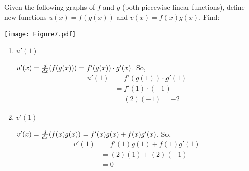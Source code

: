 \documentclass[nooutcomes]{ximera}
\begin{document}
\begin{problem}
  Given the following graphs of $f$ and $g$ (both piecewise
  linear functions), define new functions $u(x) = f(g(x))$ and
  $v(x) = f(x)g(x)$.  Find:

  \begin{image}
    \texttt{[image: Figure7.pdf]}
  \end{image}

  \begin{enumerate}
	
  \item $u'(1)$
    \begin{freeResponse}
      $u'(x) = \frac{d}{dx}(f(g(x))) = f'(g(x)) \cdot g'(x)$.  So,
      \begin{align*}
        u'(1) &= f'(g(1)) \cdot g'(1) \\
              &= f'(1) \cdot (-1) \\
              &= (2)(-1) = -2 
      \end{align*}  
    \end{freeResponse}
		
		
		
	
  \item $v'(1)$
    \begin{freeResponse}
      $v'(x) = \frac{d}{dx}(f(x)g(x)) = f'(x)g(x) + f(x)g'(x)$.  So,
      \begin{align*}
        v'(1) &= f'(1) g(1) + f(1) g'(1) \\
              &= (2)(1) + (2)(-1) \\
              &= 0
      \end{align*}
    \end{freeResponse}
  \end{enumerate}		
			
		
\end{problem}
	
	
	
		
			
\end{document}
